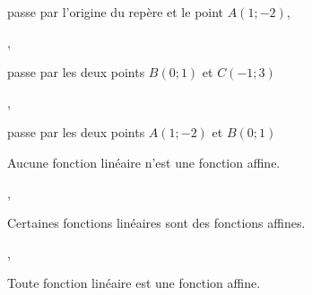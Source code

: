 \ifdefined\COMPLETE
\else
    
    
\fi

\ifdefined\CORRECTION
    \begin{alterqcm}[lq=11cm,correction]
\else
    \begin{alterqcm}[lq=11cm]
\fi


 
  

  {%
   {\begin{minipage}[t]{8cm} passe par l'origine du repère et le point $A(1;-2)$, \end{minipage}},
   {\begin{minipage}[t]{8cm}  passe par les deux points $B(0;1)$ et $C(-1;3)$ 
    \end{minipage}},
   {\begin{minipage}[t]{8cm}  passe par les deux points $A(1;-2)$ et $B(0;1)$ 
    \end{minipage}}
 }


 \AQquestion[br=3]{~}
  {%
   {\begin{minipage}[t]{9cm}  Aucune fonction linéaire n'est une fonction affine. \end{minipage}},
   {\begin{minipage}[t]{9cm}  Certaines fonctions linéaires sont des fonctions affines. 
    \end{minipage}},
   {\begin{minipage}[t]{9cm}  Toute fonction linéaire est une fonction affine.
    \end{minipage}}
 }
 
 

\end{alterqcm}
\end{alterqcm}
